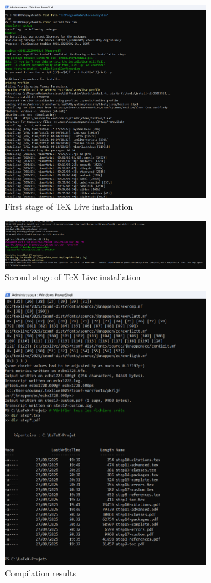 \documentclass{article}
\begin{document}
\begin{figure}[!h]
\centering
\includegraphics[width=0.8\textwidth]{im1.png}
\caption{First stage of TeX Live installation}
\label{fig:im1}
\end{figure}

\begin{figure}[!h]
\centering
\includegraphics[width=0.8\textwidth]{im1_2.png}
\caption{Second stage of TeX Live installation}
\label{fig:im2}
\end{figure}

\begin{figure}[!h]
\centering
\includegraphics[width=0.8\textwidth]{im2.png}
\caption{Compilation results}
\label{fig:im3}
\end{figure}
\end{document}
